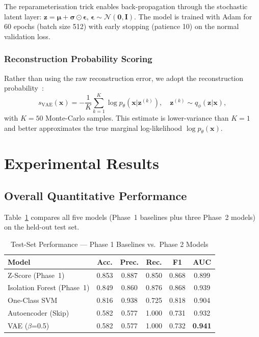 \documentclass[conference]{IEEEtran}
\begin{document}
The reparameterisation trick \cite{kingma2013auto} enables back-propagation
through the stochastic latent layer:
$\mathbf{z} = \boldsymbol{\mu} + \boldsymbol{\sigma}\odot\boldsymbol{\epsilon}$,
$\boldsymbol{\epsilon}\sim\mathcal{N}(\mathbf{0},\mathbf{I})$.
The model is trained with Adam for 60 epochs (batch size 512) with early
stopping (patience 10) on the normal validation loss.

\subsubsection{Reconstruction Probability Scoring}

Rather than using the raw reconstruction error, we adopt the reconstruction
probability~\cite{an2015variational}:
\begin{equation}
  s_\text{VAE}(\mathbf{x}) =
    -\frac{1}{K}\sum_{k=1}^K \log p_\theta(\mathbf{x}|\mathbf{z}^{(k)}),
  \quad \mathbf{z}^{(k)}\sim q_\phi(\mathbf{z}|\mathbf{x}),
\end{equation}
with $K=50$ Monte-Carlo samples. This estimate is lower-variance than $K=1$
and better approximates the true marginal log-likelihood
$\log p_\theta(\mathbf{x})$.

\section{Experimental Results}
\label{sec:results}

\subsection{Overall Quantitative Performance}

Table~\ref{tab:results} compares all five models (Phase~1 baselines plus three
Phase~2 models) on the held-out test set.

\begin{table}[!t]
\renewcommand{\arraystretch}{1.2}
\caption{Test-Set Performance --- Phase 1 Baselines vs.\ Phase 2 Models}
\label{tab:results}
\centering
\begin{tabular}{lccccc}
\toprule
\textbf{Model} & \textbf{Acc.} & \textbf{Prec.} & \textbf{Rec.} & \textbf{F1} & \textbf{AUC} \\
\midrule
Z-Score (Phase~1)          & 0.853 & 0.887 & 0.850 & 0.868 & 0.899 \\
Isolation Forest (Phase~1) & 0.849 & 0.860 & 0.876 & 0.868 & 0.939 \\
\midrule
One-Class SVM              & 0.816 & 0.938 & 0.725 & 0.818 & 0.904 \\
Autoencoder (Skip)         & 0.582 & 0.577 & 1.000 & 0.731 & 0.932 \\
VAE ($\beta$=0.5)          & 0.582 & 0.577 & 1.000 & 0.732 & \textbf{0.941} \\
\bottomrule
\end{tabular}
\end{table}
\end{document}
